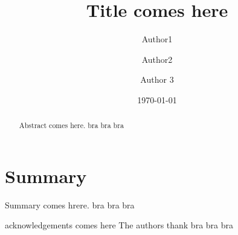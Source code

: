 \documentclass[superscriptaddress, onecolumn, 11pt]{revtex4-1}
\begin{document}
\title{
Title comes here
}

\author{Author1}

\author{Author2}

\author{Author 3}

\date{\today}

\begin{abstract}
  Abstract comes here. bra bra bra
\end{abstract}

\maketitle

%
%
%

%


\section{Summary}
  Summary comes hrere. bra bra bra


\begin{acknowledgements}
  acknowledgements comes here
  The authors thank bra bra bra

\end{acknowledgements}




\end{document}

